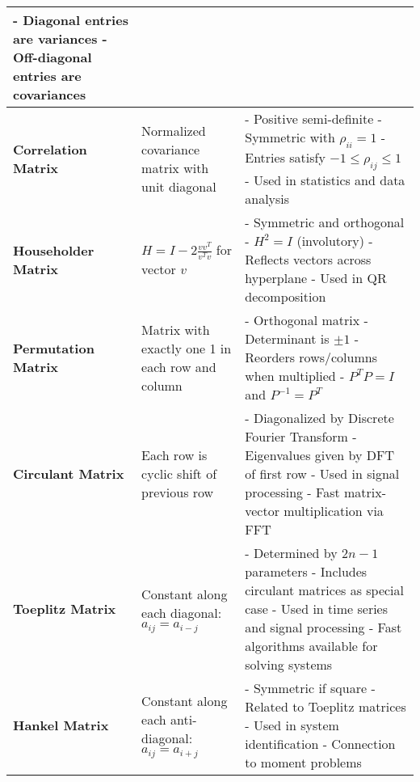 \documentclass[12pt]{article}
\begin{document}
\begin{longtable}{|>{\bfseries}m{3.5cm}|m{5cm}|m{10.5cm}|}
		- Diagonal entries are variances \newline
		- Off-diagonal entries are covariances \\
		\hline
		Correlation Matrix & Normalized covariance matrix with unit diagonal &
		- Positive semi-definite \newline
		- Symmetric with $\rho_{ii} = 1$ \newline
		- Entries satisfy $-1 \leq \rho_{ij} \leq 1$ \newline
		- Used in statistics and data analysis \\
		\hline
		Householder Matrix & $H = I - 2\frac{vv^T}{v^T v}$ for vector $v$ &
		- Symmetric and orthogonal \newline
		- $H^2 = I$ (involutory) \newline
		- Reflects vectors across hyperplane \newline
		- Used in QR decomposition \\
		\hline
		Permutation Matrix & Matrix with exactly one 1 in each row and column &
		- Orthogonal matrix \newline
		- Determinant is $\pm 1$ \newline
		- Reorders rows/columns when multiplied \newline
		- $P^T P = I$ and $P^{-1} = P^T$ \\
		\hline
		Circulant Matrix & Each row is cyclic shift of previous row &
		- Diagonalized by Discrete Fourier Transform \newline
		- Eigenvalues given by DFT of first row \newline
		- Used in signal processing \newline
		- Fast matrix-vector multiplication via FFT \\
		\hline
		Toeplitz Matrix & Constant along each diagonal: $a_{ij} = a_{i-j}$ &
		- Determined by $2n-1$ parameters \newline
		- Includes circulant matrices as special case \newline
		- Used in time series and signal processing \newline
		- Fast algorithms available for solving systems \\
		\hline
		Hankel Matrix & Constant along each anti-diagonal: $a_{ij} = a_{i+j}$ &
		- Symmetric if square \newline
		- Related to Toeplitz matrices \newline
		- Used in system identification \newline
		- Connection to moment problems \\
		\hline

\end{longtable}
\end{document}
